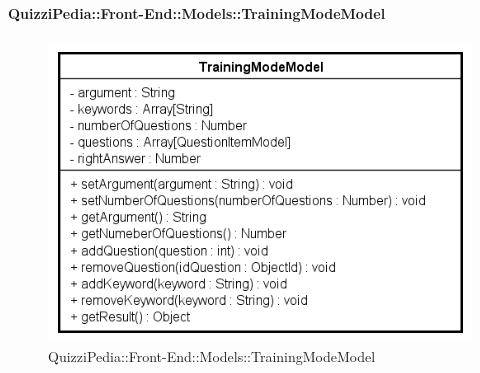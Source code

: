 \paragraph{QuizziPedia::Front-End::Models::TrainingModeModel}
		
		\label{QuizziPedia::Front-End::Models::TrainingModeModel}
		
		\begin{figure}[ht]
			\centering
			\includegraphics[scale=0.5,keepaspectratio]{UML/Classi/Front-End/QuizziPedia_Front-end_Models_TrainingModeModel.png}
			\caption{QuizziPedia::Front-End::Models::TrainingModeModel}
		\end{figure} \FloatBarrier
		

